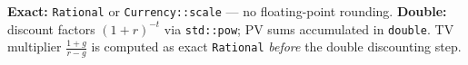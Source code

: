 \documentclass[11pt, a4paper, landscape]{article}
\begin{document}
\begin{center}

\vspace{0.25em}
{\scriptsize
\textbf{Exact:} \texttt{Rational} or \texttt{Currency::scale} --- no floating-point rounding.
\quad
\textbf{Double:} discount factors $(1+r)^{-t}$ via \texttt{std::pow}; PV sums accumulated in \texttt{double}.
\quad
TV multiplier $\tfrac{1+g}{r-g}$ is computed as exact \texttt{Rational}
\emph{before} the double discounting step.
}

\end{center}
\end{document}
